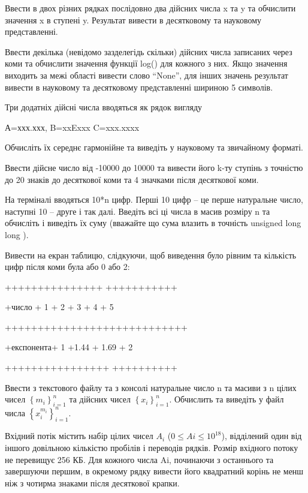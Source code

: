 \documentclass[]{article}
\begin{document}
\protect\hypertarget{_Hlk65238415}{}{}Ввести в двох різних рядках
послідовно два дійсних числа x та y та обчислити значення x в ступені y.
Результат вивести в десятковому та науковому представленні.

\protect\hypertarget{_Hlk65238515}{}{}Ввести декілька (невідомо
зазделегідь скільки) дійсних числа записаних через коми та обчислити
значення функції log() для кожного з них. Якщо значення виходить за межі
області вивести слово ``None'', для інших значень результат вивести в
науковому та десятковому представленні шириною 5 символів.

Три додатніх дійсні числа вводяться як рядок вигляду

А=ххх.ххх, B=xxExxx C=xxx.xxxx

Обчисліть їх середнє гармонійне та виведіть у науковому та звичайному
форматі.

Ввести дійсне число від -10000 до 10000 та вивести його k-ту ступінь з
точністю до 20 знаків до десяткової коми та 4 значками після десяткової
коми.

\protect\hypertarget{_Hlk65238442}{}{}На терміналі вводяться 10*n цифр.
Перші 10 цифр -- це перше натуральне число, наступні 10 -- друге і так
далі. Введіть всі ці числа в масив розміру n та обчисліть і виведіть їх
суму (вважайте що сума влазить в точність unsigned long long ).

Вивести на екран таблицю, слідкуючи, щоб виведення було рівним та
кількість цифр після коми була або 0 або 2:

+++++++++++++++ +++++++++++

+число + 1 + 2 + 3 + 4 + 5

++++++++++++++++++++++++++++

+експонента+ 1 +1.44 + 1.69 + 2

++++++++++++++++ ++++++++++

Ввести з текстового файлу та з консолі натуральне число n та масиви з n
цілих чисел \(\left\{ m_{i} \right\}_{i = 1}^{n}\) та дійсних чисел
\(\left\{ x_{i} \right\}_{i = 1}^{n}\). Обчислить та виведіть у файл
числа \(\left\{ x_{i}^{m_{i}} \right\}_{i = 1}^{n}\).

Вхідний потік містить набір цілих
чисел $A_i$ ($0 \le Ai \le 10^{18}$), відділений один від іншого
довільною кількістю пробілів і переводів рядків. Розмір вхідного потоку
не перевищує 256 КБ. Для кожного числа Ai, починаючи з останнього та
завершуючи першим, в окремому рядку вивести його квадратний корінь не
менш ніж з чотирма знаками після десяткової крапки.
\end{document}
